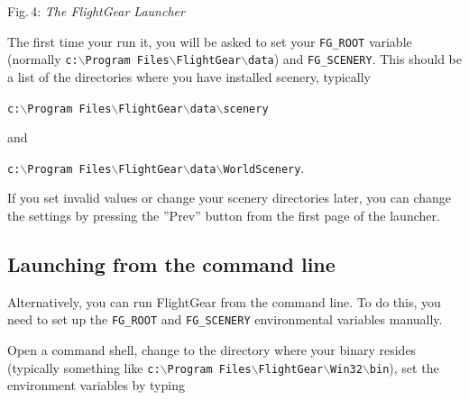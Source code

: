  \centerline{}
\smallskip
\noindent
Fig.\,4: \textit{The FlightGear Launcher}

\medskip

The first time your run it, you will be asked to set your \texttt{FG\_ROOT} variable 
(normally \texttt{c:$\backslash$Program Files$\backslash$FlightGear$\backslash$data}) and \texttt{FG\_SCENERY}. 
This should be a list of the directories where you have installed scenery, typically 

\medskip
\texttt{c:$\backslash$Program Files$\backslash$FlightGear$\backslash$data$\backslash$scenery} 
\medskip

and 

\medskip
\texttt{c:$\backslash$Program Files$\backslash$FlightGear$\backslash$data$\backslash$WorldScenery}.
\medskip

If you set invalid values or change your scenery directories later, you can 
change the settings by pressing the ''Prev'' button from the first page of
the launcher.

\subsection{Launching from the command line}

Alternatively, you can run FlightGear from the command line. To do this, you
need to set up the \texttt{FG\_ROOT} and \texttt{FG\_SCENERY} environmental
variables manually.

Open a command shell, change to the directory where your binary resides
(typically something like 
\texttt{c:$\backslash$Program Files$\backslash$FlightGear$\backslash$Win32$\backslash$bin}), 
set the environment variables by typing 
\medskip


